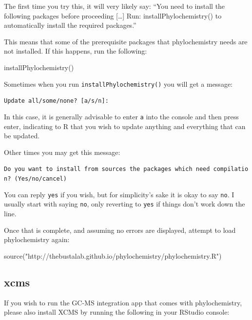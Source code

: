 \documentclass[
]{krantz}
\newenvironment{Shaded}{\begin{snugshade}}{\end{snugshade}}
\newcommand{\FunctionTok}[1]{\textcolor[rgb]{0.00,0.00,0.00}{#1}}
\newcommand{\NormalTok}[1]{#1}
\newcommand{\StringTok}[1]{\textcolor[rgb]{0.31,0.60,0.02}{#1}}
\begin{document}
The first time you try this, it will very likely say: ``You need to install the following packages before proceeding {[}\ldots{]} Run: installPhylochemistry() to automatically install the required packages.''

This means that some of the prerequisite packages that phylochemistry needs are not installed. If this happens, run the following:

\begin{Shaded}
\begin{Highlighting}[]
\FunctionTok{installPhylochemistry}\NormalTok{()}
\end{Highlighting}
\end{Shaded}

Sometimes when you run \texttt{installPhylochemistry()} you will get a message:

\texttt{Update\ all/some/none?\ {[}a/s/n{]}:}

In this case, it is generally advisable to enter \texttt{a} into the console and then press enter, indicating to R that you wish to update anything and everything that can be updated.

Other times you may get this message:

\texttt{Do\ you\ want\ to\ install\ from\ sources\ the\ packages\ which\ need\ compilation?\ (Yes/no/cancel)}

You can reply \texttt{yes} if you wish, but for simplicity's sake it is okay to say \texttt{no}. I usually start with saying \texttt{no}, only reverting to \texttt{yes} if things don't work down the line.

Once that is complete, and assuming no errors are displayed, attempt to load phylochemistry again:

\begin{Shaded}
\begin{Highlighting}[]
\FunctionTok{source}\NormalTok{(}\StringTok{"http://thebustalab.github.io/phylochemistry/phylochemistry.R"}\NormalTok{)}
\end{Highlighting}
\end{Shaded}

\hypertarget{xcms}{%
\subsection{xcms}\label{xcms}}

If you wish to run the GC-MS integration app that comes with phylochemistry, please also install XCMS by running the following in your RStudio console:
\end{document}
